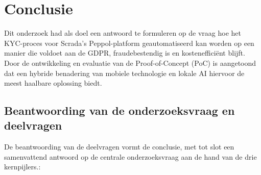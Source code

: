 
\chapter{Conclusie}%
\label{ch:conclusie}


Dit onderzoek had als doel een antwoord te formuleren op de vraag hoe het KYC-proces voor Scrada’s Peppol-platform geautomatiseerd kan worden op een manier die voldoet aan de GDPR, fraudebestendig is en kostenefficiënt blijft. 
Door de ontwikkeling en evaluatie van de Proof-of-Concept (PoC) is aangetoond dat een hybride benadering van mobiele technologie en lokale AI hiervoor de meest haalbare oplossing biedt.

\section{Beantwoording van de onderzoeksvraag en deelvragen}
De beantwoording van de deelvragen vormt de conclusie, met tot slot een samenvattend antwoord op de centrale onderzoeksvraag aan de hand van de drie kernpijlers.:

